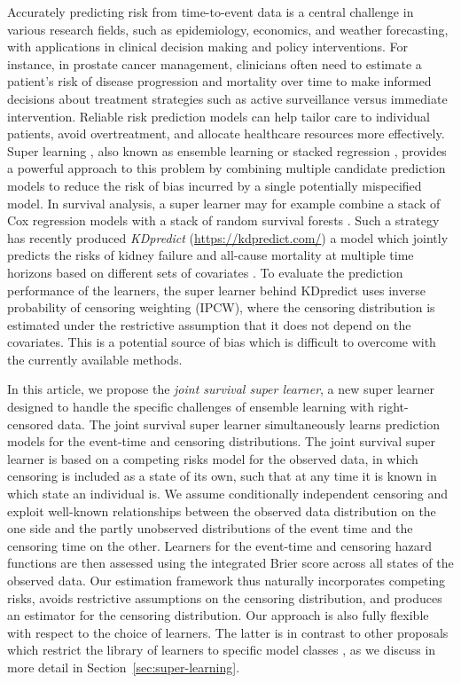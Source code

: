 \documentclass[a4paper,danish]{article}
\newcommand{\1}{\mathds{1}}
\theoremstyle{plain} %
\numberwithin{theorem}{section}
\theoremstyle{definition} %
\theoremstyle{remark}
\begin{document}
Accurately predicting risk from time-to-event data is a central
challenge in various research fields, such as epidemiology, economics,
and weather forecasting, with applications in clinical decision making
and policy interventions. For instance, in prostate cancer management,
clinicians often need to estimate a patient’s risk of disease
progression and mortality over time to make informed decisions about
treatment strategies such as active surveillance versus immediate
intervention. Reliable risk prediction models can help tailor care to
individual patients, avoid overtreatment, and allocate healthcare
resources more effectively. Super learning \citep{van2007super}, also
known as ensemble learning or stacked regression
\citep{wolpert1992stacked,breiman1996stacked}, provides a powerful
approach to this problem by combining multiple candidate prediction
models to reduce the risk of bias incurred by a single potentially
mispecified model. In survival analysis, a super learner may for example combine a
stack of Cox regression models with a stack of random survival forests
\citep[][Section 8.4]{gerds2021medical}. Such a strategy has recently
produced \textit{KDpredict} (\url{https://kdpredict.com/}) a model which
jointly predicts the risks of kidney failure and all-cause mortality
at multiple time horizons based on different sets of covariates
\citep{liu2024predicting}. To evaluate the prediction performance of
the learners, the super learner behind KDpredict uses inverse
probability of censoring weighting (IPCW), where the censoring
distribution is estimated under the restrictive assumption that it
does not depend on the covariates. This is a potential source of bias
which is difficult to overcome with the currently available methods.

In this article, we propose the {\it joint survival super learner}, a
new super learner designed to handle the specific challenges of
ensemble learning with right-censored data. The joint survival super
learner simultaneously learns prediction models for the event-time and
censoring distributions. The joint survival super learner is based on
a competing risks model for the observed data, in which censoring is
included as a state of its own, such that at any time it is known in
which state an individual is. We assume conditionally independent
censoring and exploit well-known relationships between the observed
data distribution on the one side and the partly unobserved
distributions of the event time and the censoring time on the
other. Learners for the event-time and censoring hazard functions are
then assessed using the integrated Brier score across all states of
the observed data. Our estimation framework thus naturally
incorporates competing risks, avoids restrictive assumptions on the
censoring distribution, and produces an estimator for the censoring
distribution. Our approach is also fully flexible with respect to the
choice of learners. The latter is in contrast to other proposals which
restrict the library of learners to specific model classes
\citep{polley2011-sl-cens,golmakani2020super}, as we discuss in more
detail in Section~\ref{sec:super-learning}.
\end{document}

